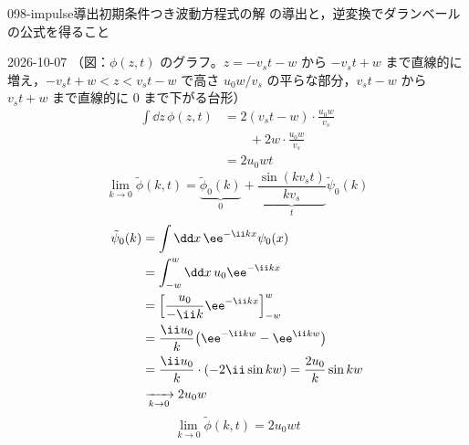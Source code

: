 \documentclass[uplatex,dvipdfmx,a4paper,11pt]{jsarticle}
\begin{document}
\begin{mondai}{098-impulse}{導出}{初期条件つき波動方程式の解  の導出と，逆変換でダランベールの公式を得ること}
\begin{kotaeutsushi}{2026-10-07}
（図：$\phi(z,t)$ のグラフ。$z=-v_st-w$ から $-v_st+w$ まで直線的に増え，$-v_st+w<z<v_st-w$ で高さ $u_0w/v_s$ の平らな部分，$v_st-w$ から $v_st+w$ まで直線的に $0$ まで下がる台形）
\begin{align*}
  \int\dd z\,\phi(z,t)&=2(v_st-w)\cdot\frac{u_0w}{v_s}\\
  &\qquad+2w\cdot\frac{u_0w}{v_s}\\
  &=2u_0wt
\end{align*}
\[ \lim_{k\to0}\tilde{\phi}(k,t)=\underbrace{\tilde{\phi}_0(k)}_{0}+\underbrace{\frac{\sin(kv_st)}{kv_s}}_{t}\tilde{\psi}_0(k) \]
\begin{align*}
  \tilde{\psi}_0(k)&=\int\dd x\,\ee^{-\ii kx}\psi_0(x)\\
  &=\int_{-w}^{w}\dd x\,u_0\ee^{-\ii kx}\\
  &=\Bigl[\frac{u_0}{-\ii k}\ee^{-\ii kx}\Bigr]_{-w}^{w}\\
  &=\frac{\ii u_0}{k}\bigl(\ee^{-\ii kw}-\ee^{\ii kw}\bigr)\\
  &=\frac{\ii u_0}{k}\cdot(-2\ii\sin kw)=\frac{2u_0}{k}\sin kw\\
  &\xrightarrow[k\to0]{}2u_0w
\end{align*}
\[ \lim_{k\to0}\tilde{\phi}(k,t)=2u_0wt \]
\end{kotaeutsushi}
\end{mondai}

\noteowari
\end{document}
